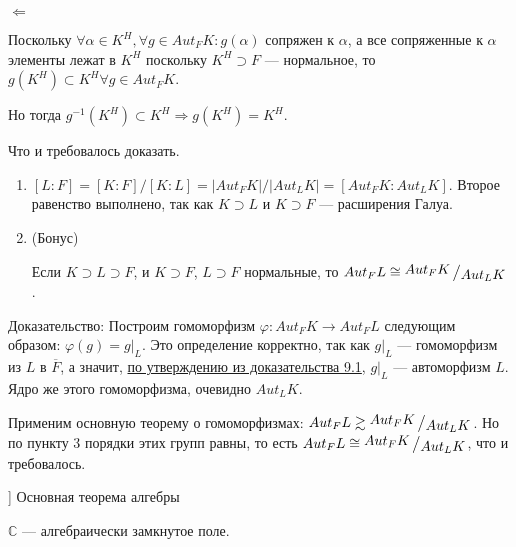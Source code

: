 \begin{solution}
\(\Leftarrow\)

Поскольку \(\forall \alpha \in K^H, \forall g \in Aut_FK: g(\alpha)\) сопряжен к \(\alpha\), а все сопряженные к \(\alpha\) элементы лежат в \(K^H\) поскольку \(K^H \supset F\) --- нормальное, то \(g(K^H) \subset K^H \forall g \in Aut_FK\).

Но тогда \(g^{-1}(K^H) \subset K^H \Rightarrow g(K^H) = K^H\).

Что и требовалось доказать.

\begin{enumerate}
\def\labelenumi{\arabic{enumi})}
\setcounter{enumi}{2}
\item
  \([L : F] = [K : F] / [K : L] = |Aut_FK| / |Aut_LK| = [Aut_FK : Aut_LK]\). Второе равенство выполнено, так как \(K \supset L\) и \(K \supset F\) --- расширения Галуа.
\item
  \hypertarget{9.4.bonus}{(Бонус)}
  Если \(K \supset L \supset F\), и \(K \supset F\), \(L \supset F\) нормальные, то \(Aut_FL \cong \bigslant{Aut_FK}{Aut_LK}\).
\end{enumerate}

Доказательство: Построим гомоморфизм \(\varphi: Aut_FK \to Aut_FL\) следующим образом: \(\varphi(g) = g|_L\). Это определение корректно, так как \(g|_L\) --- гомоморфизм из \(L\) в \(\overline{F}\), а значит, \hyperlink{9.1.statement.2}{по утверждению из доказательства 9.1}, \(g|_L\) --- автоморфизм \(L\). Ядро же этого гомоморфизма, очевидно \(Aut_LK\).

Применим основную теорему о гомоморфизмах:
\(Aut_FL \gtrsim \bigslant{Aut_FK}{Aut_LK}\). Но по пункту 3 порядки этих групп равны, то есть \(Aut_FL \cong \bigslant{Aut_FK}{Aut_LK}\), что и требовалось.
\end{solution}

\begin{problem}[10 [Каргальцев]]
Основная теорема алгебры

$\mathbb{C}$ --- алгебраически замкнутое поле.
\end{problem}

